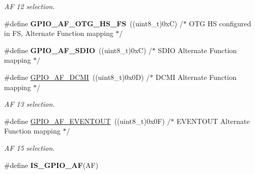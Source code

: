 \begin{DoxyCompactItemize}
\begin{DoxyCompactList}\small\item\em A\-F 12 selection. \end{DoxyCompactList}\item 
\hypertarget{group___g_p_i_o___alternat__function__selection__define_ga5f30e17f7328fa05e6dd8b799ae5e6ee}{\#define {\bfseries G\-P\-I\-O\-\_\-\-A\-F\-\_\-\-O\-T\-G\-\_\-\-H\-S\-\_\-\-F\-S}~((uint8\-\_\-t)0x\-C)  /$\ast$ O\-T\-G H\-S configured in F\-S, Alternate Function mapping $\ast$/}\label{group___g_p_i_o___alternat__function__selection__define_ga5f30e17f7328fa05e6dd8b799ae5e6ee}

\item 
\hypertarget{group___g_p_i_o___alternat__function__selection__define_ga0ae9928f85fc99947659994eb025cc2b}{\#define {\bfseries G\-P\-I\-O\-\_\-\-A\-F\-\_\-\-S\-D\-I\-O}~((uint8\-\_\-t)0x\-C)  /$\ast$ S\-D\-I\-O Alternate Function mapping $\ast$/}\label{group___g_p_i_o___alternat__function__selection__define_ga0ae9928f85fc99947659994eb025cc2b}

\item 
\hypertarget{group___g_p_i_o___alternat__function__selection__define_gaa7bfafac663bac5d437bd6d6a2f6774d}{\#define \hyperlink{group___g_p_i_o___alternat__function__selection__define_gaa7bfafac663bac5d437bd6d6a2f6774d}{G\-P\-I\-O\-\_\-\-A\-F\-\_\-\-D\-C\-M\-I}~((uint8\-\_\-t)0x0\-D)  /$\ast$ D\-C\-M\-I Alternate Function mapping $\ast$/}\label{group___g_p_i_o___alternat__function__selection__define_gaa7bfafac663bac5d437bd6d6a2f6774d}

\begin{DoxyCompactList}\small\item\em A\-F 13 selection. \end{DoxyCompactList}\item 
\hypertarget{group___g_p_i_o___alternat__function__selection__define_gacd5e7846b3709cddbf41ece2b1fb068e}{\#define \hyperlink{group___g_p_i_o___alternat__function__selection__define_gacd5e7846b3709cddbf41ece2b1fb068e}{G\-P\-I\-O\-\_\-\-A\-F\-\_\-\-E\-V\-E\-N\-T\-O\-U\-T}~((uint8\-\_\-t)0x0\-F)  /$\ast$ E\-V\-E\-N\-T\-O\-U\-T Alternate Function mapping $\ast$/}\label{group___g_p_i_o___alternat__function__selection__define_gacd5e7846b3709cddbf41ece2b1fb068e}

\begin{DoxyCompactList}\small\item\em A\-F 15 selection. \end{DoxyCompactList}\item 
\#define {\bfseries I\-S\-\_\-\-G\-P\-I\-O\-\_\-\-A\-F}(A\-F)
\end{DoxyCompactItemize}


